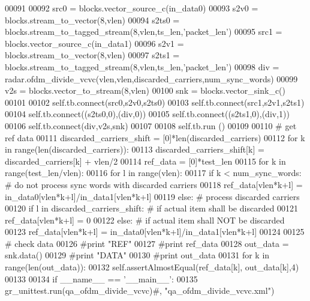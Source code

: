 \begin{DoxyCode}
00091             
00092         src0 = blocks.vector\_source\_c(in\_data0)
00093         s2v0 = blocks.stream\_to\_vector(8,vlen)
00094         s2ts0 = blocks.stream\_to\_tagged\_stream(8,vlen,ts\_len,\textcolor{stringliteral}{'packet\_len'})
00095         src1 = blocks.vector\_source\_c(in\_data1)
00096         s2v1 = blocks.stream\_to\_vector(8,vlen)
00097         s2ts1 = blocks.stream\_to\_tagged\_stream(8,vlen,ts\_len,\textcolor{stringliteral}{'packet\_len'})
00098         div = radar.ofdm\_divide\_vcvc(vlen,vlen,discarded\_carriers,num\_sync\_words)
00099         v2s = blocks.vector\_to\_stream(8,vlen)
00100         snk = blocks.vector\_sink\_c()
00101         
00102         self.tb.connect(src0,s2v0,s2ts0)
00103         self.tb.connect(src1,s2v1,s2ts1)
00104         self.tb.connect((s2ts0,0),(div,0))
00105         self.tb.connect((s2ts1,0),(div,1))
00106         self.tb.connect(div,v2s,snk)
00107         
00108         self.tb.run ()
00109         
00110         \textcolor{comment}{# get ref data}
00111         discarded\_carriers\_shift = [0]*len(discarded\_carriers)
00112         \textcolor{keywordflow}{for} k \textcolor{keywordflow}{in} range(len(discarded\_carriers)):
00113             discarded\_carriers\_shift[k] = discarded\_carriers[k] + vlen/2
00114         ref\_data = [0]*test\_len
00115         \textcolor{keywordflow}{for} k \textcolor{keywordflow}{in} range(test\_len/vlen):
00116             \textcolor{keywordflow}{for} l \textcolor{keywordflow}{in} range(vlen):
00117                 \textcolor{keywordflow}{if} k < num\_sync\_words: \textcolor{comment}{# do not process sync words with discarded carriers}
00118                     ref\_data[vlen*k+l] = in\_data0[vlen*k+l]/in\_data1[vlen*k+l]
00119                 \textcolor{keywordflow}{else}: \textcolor{comment}{# process discarded carriers}
00120                     \textcolor{keywordflow}{if} l \textcolor{keywordflow}{in} discarded\_carriers\_shift: \textcolor{comment}{# if actual item shall be discarded}
00121                         ref\_data[vlen*k+l] = 0
00122                     \textcolor{keywordflow}{else}: \textcolor{comment}{# if actual item shall NOT be discarded}
00123                         ref\_data[vlen*k+l] = in\_data0[vlen*k+l]/in\_data1[vlen*k+l]
00124         
00125         \textcolor{comment}{# check data}
00126         \textcolor{comment}{#print "REF"}
00127         \textcolor{comment}{#print ref\_data}
00128         out\_data =  snk.data()
00129         \textcolor{comment}{#print "DATA"}
00130         \textcolor{comment}{#print out\_data}
00131         \textcolor{keywordflow}{for} k \textcolor{keywordflow}{in} range(len(out\_data)):
00132             self.assertAlmostEqual(ref\_data[k], out\_data[k],4)
00133 
00134 \textcolor{keywordflow}{if} \_\_name\_\_ == \textcolor{stringliteral}{'\_\_main\_\_'}:
00135     gr\_unittest.run(qa\_ofdm\_divide\_vcvc)\textcolor{comment}{#, "qa\_ofdm\_divide\_vcvc.xml")}
\end{DoxyCode}
